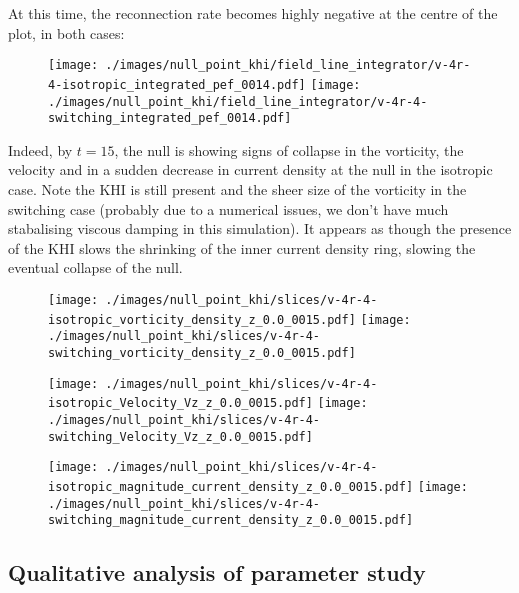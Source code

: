 At this time, the reconnection rate becomes highly negative at the centre of the plot, in both cases:

\begin{figure}[H]
  \centering
  \texttt{[image: ./images/null\_point\_khi/field\_line\_integrator/v-4r-4-isotropic\_integrated\_pef\_0014.pdf]}
  \texttt{[image: ./images/null\_point\_khi/field\_line\_integrator/v-4r-4-switching\_integrated\_pef\_0014.pdf]}
\end{figure}

Indeed, by $t=15$, the null is showing signs of collapse in the vorticity, the velocity and in a sudden decrease in current density at the null in the isotropic case.  Note the KHI is still present and the sheer size of the vorticity in the switching case (probably due to a numerical issues, we don't have much stabalising viscous damping in this simulation). It appears as though the presence of the KHI slows the shrinking of the inner current density ring, slowing the eventual collapse of the null.

\begin{figure}[H]
  \centering
  \texttt{[image: ./images/null\_point\_khi/slices/v-4r-4-isotropic\_vorticity\_density\_z\_0.0\_0015.pdf]}
  \texttt{[image: ./images/null\_point\_khi/slices/v-4r-4-switching\_vorticity\_density\_z\_0.0\_0015.pdf]}
\end{figure}

\begin{figure}[H]
  \centering
  \texttt{[image: ./images/null\_point\_khi/slices/v-4r-4-isotropic\_Velocity\_Vz\_z\_0.0\_0015.pdf]}
  \texttt{[image: ./images/null\_point\_khi/slices/v-4r-4-switching\_Velocity\_Vz\_z\_0.0\_0015.pdf]}
\end{figure}

\begin{figure}[H]
  \centering
  \texttt{[image: ./images/null\_point\_khi/slices/v-4r-4-isotropic\_magnitude\_current\_density\_z\_0.0\_0015.pdf]}
  \texttt{[image: ./images/null\_point\_khi/slices/v-4r-4-switching\_magnitude\_current\_density\_z\_0.0\_0015.pdf]}
\end{figure}

\subsection{Qualitative analysis of parameter study}


